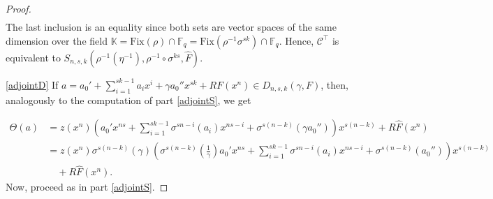 \documentclass[a4paper, 11pt]{article}
\DeclareMathOperator{\C}{\mathcal{C}}
\newcommand{\F}{{\mathbb F}}
\newcommand{\M}{\mathrm{M}}
\begin{document}
\begin{proof}
\[\begin{split}
\end{split}
\]
The last inclusion is an equality since both sets are vector spaces of the same dimension over the field \(\mathbb{K} = \mathrm{Fix}(\rho) \cap \mathbb{F}_q = \mathrm{Fix}(\rho^{-1} \sigma^{sk}) \cap \mathbb{F}_q\). Hence, \(\mathcal{C}^{\top}\) is equivalent to  \(S_{n,s,k}(\rho^{-1}(\eta^{-1}),\rho^{-1}\circ \sigma^{ks},\hat{F})\).

\eqref{adjointD} If \(a = a_0'+\sum_{i=1}^{sk-1} a_i x^i + \gamma a_0'' x^{sk} +RF(x^n) \in D_{n,s,k}(\gamma,F)\),  then, analogously to the computation of part \eqref{adjointS}, we get 


\[
\begin{split}
\Theta (a) & = z(x^n)\left(a_0'x^{ns}+ \sum\limits_{i=1}^{sk-1}\sigma^{sn-i}(a_i)x^{ns-i} +\sigma^{s(n-k)}(\gamma a_0'')\right)x^{s(n-k)} + R\hat{F}(x^n) \\
& =z(x^n)\sigma^{s(n-k)}(\gamma) \left(\sigma^{s(n-k)}\left(\frac{1}{\gamma}\right)a_0'x^{ns}+ \sum\limits_{i=1}^{sk-1}\sigma^{sn-i}(a_i)x^{ns-i} +\sigma^{s(n-k)}(a_0'')\right)x^{s(n-k)} \\
&\quad + R\hat{F}(x^n). 
\end{split}
\]
Now, proceed as in part \eqref{adjointS}. 
\end{proof}
\end{document}
